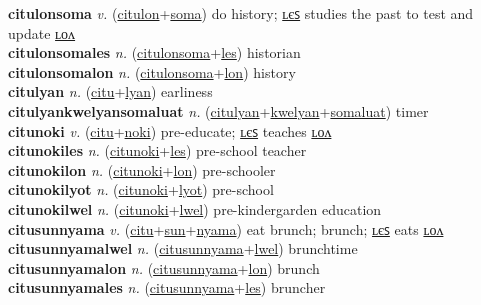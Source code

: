 \textbf{citulonsoma} \textit{v.} (\hyperref[citulon]{citulon}+\hyperref[soma]{soma})
do history; \hyperref[citulonsomales]{ʟєꜱ} studies the past to test and update \hyperref[citulonsomalon]{ʟᴏᴧ} \label{citulonsoma} \\
\textbf{citulonsomales} \textit{n.} (\hyperref[citulonsoma]{citulonsoma}+\hyperref[les]{les})
historian \label{citulonsomales} \\
\textbf{citulonsomalon} \textit{n.} (\hyperref[citulonsoma]{citulonsoma}+\hyperref[lon]{lon})
history \label{citulonsomalon} \\
\textbf{citulyan} \textit{n.} (\hyperref[citu]{citu}+\hyperref[lyan]{lyan})
earliness \label{citulyan} \\
\textbf{citulyankwelyansomaluat} \textit{n.} (\hyperref[citulyan]{citulyan}+\hyperref[kwelyan]{kwelyan}+\hyperref[somaluat]{somaluat})
timer \label{citulyankwelyansomaluat} \\
\textbf{citunoki} \textit{v.} (\hyperref[citu]{citu}+\hyperref[noki]{noki})
pre-educate; \hyperref[citunokiles]{ʟєꜱ} teaches \hyperref[citunokilon]{ʟᴏᴧ} \label{citunoki} \\
\textbf{citunokiles} \textit{n.} (\hyperref[citunoki]{citunoki}+\hyperref[les]{les})
pre-school teacher \label{citunokiles} \\
\textbf{citunokilon} \textit{n.} (\hyperref[citunoki]{citunoki}+\hyperref[lon]{lon})
pre-schooler \label{citunokilon} \\
\textbf{citunokilyot} \textit{n.} (\hyperref[citunoki]{citunoki}+\hyperref[lyot]{lyot})
pre-school \label{citunokilyot} \\
\textbf{citunokilwel} \textit{n.} (\hyperref[citunoki]{citunoki}+\hyperref[lwel]{lwel})
pre-kindergarden education \label{citunokilwel} \\
\textbf{citusunnyama} \textit{v.} (\hyperref[citu]{citu}+\hyperref[sun]{sun}+\hyperref[nyama]{nyama})
eat brunch; brunch; \hyperref[citusunnyamales]{ʟєꜱ} eats \hyperref[citusunnyamalon]{ʟᴏᴧ} \label{citusunnyama} \\
\textbf{citusunnyamalwel} \textit{n.} (\hyperref[citusunnyama]{citusunnyama}+\hyperref[lwel]{lwel})
brunchtime \label{citusunnyamalwel} \\
\textbf{citusunnyamalon} \textit{n.} (\hyperref[citusunnyama]{citusunnyama}+\hyperref[lon]{lon})
brunch \label{citusunnyamalon} \\
\textbf{citusunnyamales} \textit{n.} (\hyperref[citusunnyama]{citusunnyama}+\hyperref[les]{les})
bruncher \label{citusunnyamales} \\
